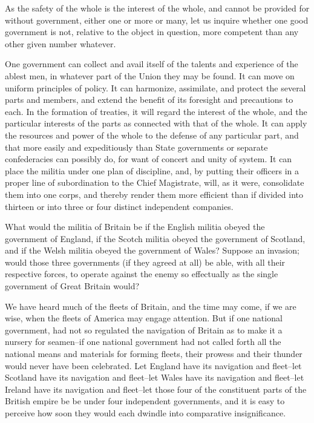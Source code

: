 As the safety of the whole is the interest of the whole, and cannot be provided for without government, either one or more or many, let us inquire whether one good government is not, relative to the object in question, more competent than any other given number whatever.

One government can collect and avail itself of the talents and experience of the ablest men, in whatever part of the Union they may be found. It can move on uniform principles of policy. It can harmonize, assimilate, and protect the several parts and members, and extend the benefit of its foresight and precautions to each. In the formation of treaties, it will regard the interest of the whole, and the particular interests of the parts as connected with that of the whole. It can apply the resources and power of the whole to the defense of any particular part, and that more easily and expeditiously than State governments or separate confederacies can possibly do, for want of concert and unity of system. It can place the militia under one plan of discipline, and, by putting their officers in a proper line of subordination to the Chief Magistrate, will, as it were, consolidate them into one corps, and thereby render them more efficient than if divided into thirteen or into three or four distinct independent companies.

What would the militia of Britain be if the English militia obeyed the government of England, if the Scotch militia obeyed the government of Scotland, and if the Welsh militia obeyed the government of Wales? Suppose an invasion; would those three governments (if they agreed at all) be able, with all their respective forces, to operate against the enemy so effectually as the single government of Great Britain would?

We have heard much of the fleets of Britain, and the time may come, if we are wise, when the fleets of America may engage attention. But if one national government, had not so regulated the navigation of Britain as to make it a nursery for seamen--if one national government had not called forth all the national means and materials for forming fleets, their prowess and their thunder would never have been celebrated. Let England have its navigation and fleet--let Scotland have its navigation and fleet--let Wales have its navigation and fleet--let Ireland have its navigation and fleet--let those four of the constituent parts of the British empire be be under four independent governments, and it is easy to perceive how soon they would each dwindle into comparative insignificance.

